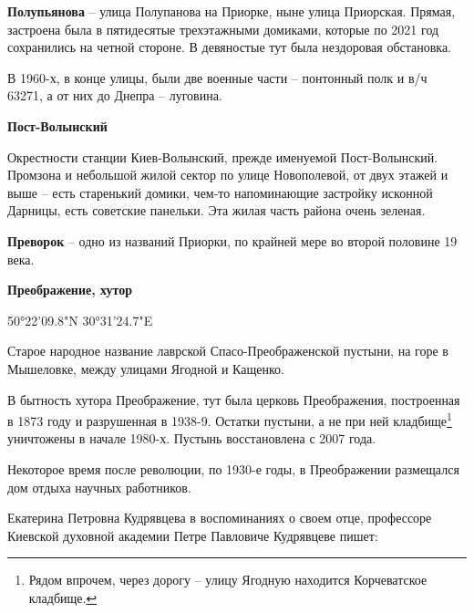 \medskip

\textbf{Полупьянова} – улица Полупанова на Приорке, ныне улица Приорская. Прямая, застроена была в пятидесятые трехэтажными домиками, которые по 2021 год сохранились на четной стороне. В девяностые тут была нездоровая обстановка.

В 1960-х, в конце улицы, были две военные части – понтонный полк и в/ч 63271, а от них до Днепра – луговина.\\

\medskip

\textbf{Пост-Волынский}

Окрестности станции Киев-Волынский, прежде именуемой Пост-Волынский. Промзона и небольшой жилой сектор по улице Новополевой, от двух этажей и выше – есть старенький домики, чем-то напоминающие застройку исконной Дарницы, есть советские  панельки. Эта жилая часть района очень зеленая.\\


\medskip


\textbf{Преворок} – одно из названий Приорки, по крайней мере во второй половине 19 века.\\

\medskip


\textbf{Преображение, хутор} 

50°22'09.8"N 30°31'24.7"E

Старое народное название лаврской Спасо-Преображенской пустыни, на горе в Мышеловке, между улицами Ягодной и Кащенко. 

   В бытность хутора Преображение, тут была церковь Преображения, построенная в 1873 году и разрушенная в 1938-9. Остатки пустыни, а не при ней кладбище\footnote{Рядом впрочем, через дорогу – улицу Ягодную находится Корчеватское кладбище.} уничтожены в начале 1980-х. Пустынь восстановлена с 2007 года.

Некоторое время после революции, по 1930-е годы, в Преображении размещался дом отдыха научных работников.

Екатерина Петровна Кудрявцева в воспоминаниях о своем отце, профессоре Киевской духовной академии Петре Павловиче Кудрявцеве пишет:

